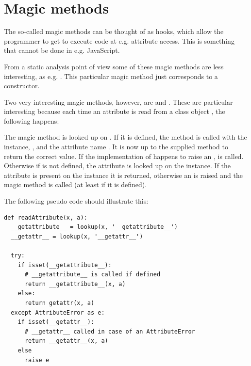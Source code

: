 \section{Magic methods}
The so-called magic methods can be thought of as hooks, which allow the programmer to get to execute code at e.g. attribute access. This is something that cannot be done in e.g. JavaScript.

From a static analysis point of view some of these magic methods are less interesting, as e.g. . This particular magic method just corresponds to a constructor.

Two very interesting magic methods, however, are  and . These are particular interesting because each time an attribute  is read from a class object , the following happens:

The magic method  is looked up on . If it is defined, the method is called with the instance, , and the attribute name . It is now up to the supplied method to return the correct value. If the implementation of  happens to raise an ,  is called. Otherwise if  is not defined, the attribute is looked up on the instance. If the attribute is present on the instance it is returned, otherwise an  is raised and the magic method  is called (at least if it is defined).

The following pseudo code should illustrate this:

\begin{listing}[H]
  \begin{verbatim}
def readAttribute(x, a):
  __getattribute__ = lookup(x, '__getattribute__')
  __getattr__ = lookup(x, '__getattr__')

  try:
    if isset(__getattribute__):
      # __getattribute__ is called if defined
      return __getattribute__(x, a)
    else:
      return getattr(x, a)
  except AttributeError as e:
    if isset(__getattr__):
      # __getattr__ called in case of an AttributeError
      return __getattr__(x, a)
    else
      raise e
  \end{verbatim}
\end{listing}

